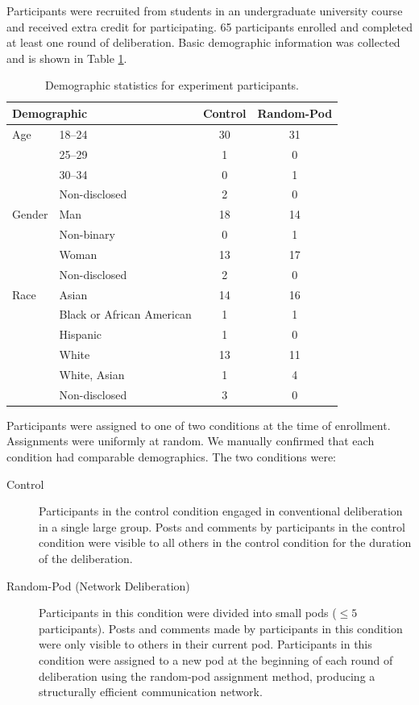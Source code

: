 Participants were recruited from students in an undergraduate university course and received extra credit for participating. 65 participants enrolled and completed at least one round of deliberation.
Basic demographic information was collected and is shown in Table \ref{tab:demographic}.

\begin{table}[]
    \centering
    \begin{tabular}{l l c c}
\hline
\multicolumn{2}{l}{Demographic} & Control & Random-Pod\\
\hline
Age & 18--24 & 30 & 31 \\
& 25--29 & 1 & 0 \\
& 30--34 & 0 & 1 \\
& Non-disclosed & 2 & 0 \\
\hline
Gender & Man & 18 & 14 \\
& Non-binary & 0 & 1 \\
& Woman & 13 & 17 \\
& Non-disclosed & 2 & 0 \\
\hline
Race & Asian & 14 & 16 \\
& Black or African American & 1 & 1 \\
& Hispanic & 1 & 0 \\
& White & 13 & 11 \\
& White, Asian & 1 & 4 \\
& Non-disclosed & 3 & 0 \\
\hline
    \end{tabular}
    \caption{Demographic statistics for experiment participants.}
    \label{tab:demographic}
\end{table}

Participants were assigned to one of two conditions at the time of enrollment.
Assignments were uniformly at random.
We manually confirmed that each condition had comparable demographics.
The two conditions were:
\begin{description}
\item[Control]{
Participants in the control condition engaged in conventional deliberation in a single large group.
Posts and comments by participants in the control condition were visible
to all others in the control condition for the duration of the deliberation.}
\item[Random-Pod (Network Deliberation)]{
Participants in this condition were divided into small pods ($\leq 5$ participants).
Posts and comments made by participants in this condition were only visible to others in their current pod.
Participants in this condition were assigned to a new pod at the beginning of each round of deliberation using the random-pod assignment method, producing a structurally efficient communication network.}
\end{description}

